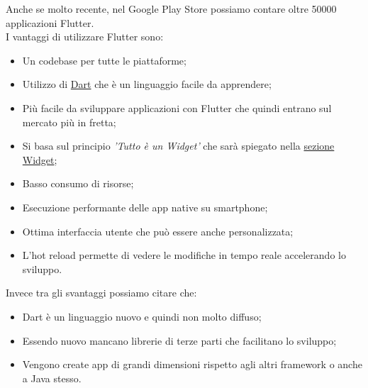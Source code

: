 \newpage
Anche se molto recente, nel Google Play Store possiamo contare oltre 50000 applicazioni Flutter.\\
I vantaggi di utilizzare Flutter sono:
\begin{itemize}
	\item Un codebase per tutte le piattaforme; 
	\item Utilizzo di \hyperref[sec:Dart]{Dart} che è un linguaggio facile da apprendere;  
	\item Più facile da sviluppare applicazioni con Flutter che quindi entrano sul mercato più in fretta;
	\item Si basa sul principio \textit{'Tutto è un Widget'} che sarà spiegato nella \hyperref[sec:Widget]{sezione Widget};
	\item Basso consumo di risorse;
	\item Esecuzione performante delle app native su smartphone;
	\item Ottima interfaccia utente che può essere anche personalizzata;
	\item L’hot reload permette di vedere le modifiche in tempo reale accelerando lo sviluppo.\\
\end{itemize}
Invece tra gli svantaggi possiamo citare che:
\begin{itemize}
	\item Dart è un linguaggio nuovo e quindi non molto diffuso; 
	\item Essendo nuovo mancano librerie di terze parti che facilitano lo sviluppo;  
	\item Vengono create app di grandi dimensioni rispetto agli altri framework o anche a Java stesso.\\
\end{itemize}
